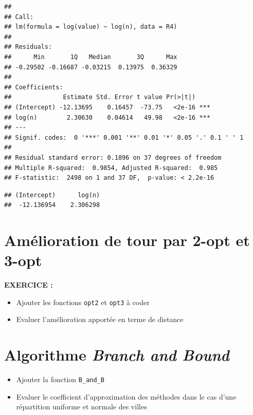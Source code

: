 \documentclass[
]{article}
\newenvironment{Shaded}{\begin{snugshade}}{\end{snugshade}}
\newcommand{\NormalTok}[1]{#1}
\newcommand{\SpecialCharTok}[1]{\textcolor[rgb]{0.00,0.00,0.00}{#1}}
\begin{document}
\begin{verbatim}
## 
## Call:
## lm(formula = log(value) ~ log(n), data = R4)
## 
## Residuals:
##      Min       1Q   Median       3Q      Max 
## -0.29502 -0.16687 -0.03215  0.13975  0.36329 
## 
## Coefficients:
##              Estimate Std. Error t value Pr(>|t|)    
## (Intercept) -12.13695    0.16457  -73.75   <2e-16 ***
## log(n)        2.30630    0.04614   49.98   <2e-16 ***
## ---
## Signif. codes:  0 '***' 0.001 '**' 0.01 '*' 0.05 '.' 0.1 ' ' 1
## 
## Residual standard error: 0.1896 on 37 degrees of freedom
## Multiple R-squared:  0.9854, Adjusted R-squared:  0.985 
## F-statistic:  2498 on 1 and 37 DF,  p-value: < 2.2e-16
\end{verbatim}

\begin{Shaded}
\end{Shaded}

\begin{verbatim}
## (Intercept)      log(n) 
##  -12.136954    2.306298
\end{verbatim}

\hypertarget{amuxe9lioration-de-tour-par-2-opt-et-3-opt}{%
\section{Amélioration de tour par 2-opt et
3-opt}\label{amuxe9lioration-de-tour-par-2-opt-et-3-opt}}

\textbf{EXERCICE :}

\begin{itemize}
\item
  Ajouter les fonctions \texttt{opt2} et \texttt{opt3} à coder
\item
  Evaluer l'amélioration apportée en terme de distance
\end{itemize}

\hypertarget{algorithme-branch-and-bound}{%
\section{\texorpdfstring{Algorithme \emph{Branch and
Bound}}{Algorithme Branch and Bound}}\label{algorithme-branch-and-bound}}

\begin{itemize}
\item
  Ajouter la fonction \texttt{B\_and\_B}
\item
  Evaluer le coefficient d'approximation des méthodes dans le cas d'une
  répartition uniforme et normale des villes
\end{itemize}
\end{document}
